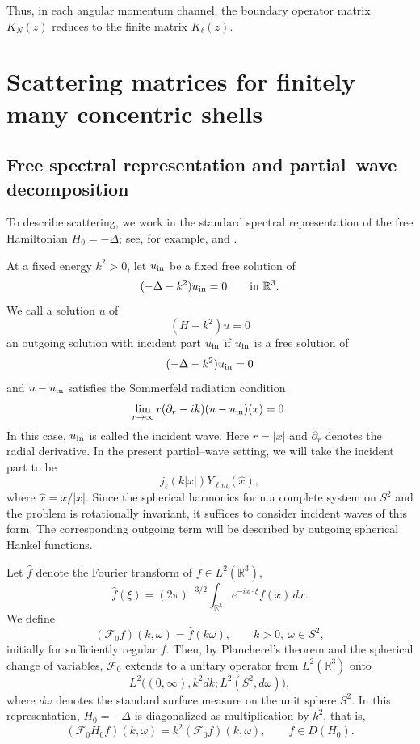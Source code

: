 \documentclass[a4paper,11pt]{article}
\numberwithin{equation}{section}
\newcommand{\R}{\mathbb{R}}
\theoremstyle{definition}
\theoremstyle{remark}
\begin{document}
Thus, in each angular momentum channel, the boundary operator matrix $K_N(z)$
reduces to the finite matrix $K_\ell(z)$.
\section{Scattering matrices for finitely many concentric shells}
\label{sec:scatt}

\subsection{Free spectral representation and partial--wave decomposition}

To describe scattering, we work in the standard spectral representation of the
free Hamiltonian $H_0=-\Delta$; see, for example,
\cite[Ch.~XI]{ReedSimonIII} and \cite{Yafaev1992}.

At a fixed energy $k^2>0$, let $u_{\rm in}$ be a fixed free solution of
$$
(-\Delta-k^2)u_{\rm in}=0
\qquad \text{in }\R^3.
$$
We call a solution $u$ of
$$
(H-k^2)u=0
$$
an outgoing solution with incident part $u_{\rm in}$ if $u_{\rm in}$ is a
free solution of
$$
(-\Delta-k^2)u_{\rm in}=0
$$
and $u-u_{\rm in}$ satisfies the Sommerfeld radiation condition
$$
\lim_{r\to\infty} r(\partial_r-ik)(u-u_{\rm in})(x)=0.
$$
In this case, $u_{\rm in}$ is called the incident wave.
Here $r=|x|$ and $\partial_r$ denotes the radial derivative. 
In the present partial--wave setting, we will take the incident part to be
$$
j_\ell(k|x|)Y_{\ell m}(\widehat x),
$$
where $\widehat x=x/|x|$. Since the spherical harmonics form a complete
system on $S^2$ and the problem is rotationally invariant, it suffices to
consider incident waves of this form. The corresponding outgoing term will
be described by outgoing spherical Hankel functions.

Let $\widehat f$ denote the Fourier transform of $f\in L^2(\R^3)$,
$$
\widehat f(\xi)
=
(2\pi)^{-3/2}\int_{\R^3}e^{-ix\cdot\xi}f(x)\,dx.
$$
We define
$$
(\mathcal F_0 f)(k,\omega)=\widehat f(k\omega),
\qquad
k>0,\ \omega\in S^2,
$$
initially for sufficiently regular $f$. Then, by Plancherel's theorem and the spherical change of variables,
$\mathcal F_0$ extends to a unitary operator from $L^2(\R^3)$ onto
$$
L^2\bigl((0,\infty),k^2dk;L^2(S^2,d\omega)\bigr),
$$
where $d\omega$ denotes the standard surface measure on the unit sphere $S^2$.
In this representation, $H_0=-\Delta$ is diagonalized as multiplication by
$k^2$, that is,
$$
(\mathcal F_0 H_0 f)(k,\omega)
=
k^2(\mathcal F_0 f)(k,\omega),
\qquad f\in D(H_0).
$$
\end{document}
